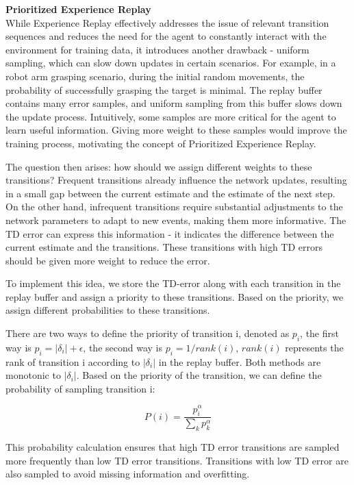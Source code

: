 \documentclass{article}
\begin{document}
\hspace*{\fill}

\noindent
\textbf{Prioritized Experience Replay}\\
\noindent
While Experience Replay effectively addresses the issue of relevant transition sequences and reduces the need for the agent to constantly interact with the environment for training data, it introduces another drawback - uniform sampling, which can slow down updates in certain scenarios. For example, in a robot arm grasping scenario, during the initial random movements, the probability of successfully grasping the target is minimal. The replay buffer contains many error samples, and uniform sampling from this buffer slows down the update process. Intuitively, some samples are more critical for the agent to learn useful information. Giving more weight to these samples would improve the training process, motivating the concept of Prioritized Experience Replay.

The question then arises: how should we assign different weights to these transitions? Frequent transitions already influence the network updates, resulting in a small gap between the current estimate and the estimate of the next step. On the other hand, infrequent transitions require substantial adjustments to the network parameters to adapt to new events, making them more informative. The TD error can express this information - it indicates the difference between the current estimate and the transitions. These transitions with high TD errors should be given more weight to reduce the error.

To implement this idea, we store the TD-error along with each transition in the replay buffer and assign a priority to these transitions. Based on the priority, we assign different probabilities to these transitions.

There are two ways to define the priority of transition i, denoted as $p_i$,  the first way is $p_i = \lvert \delta_i \rvert + \epsilon$, the second way is $p_i = 1 / rank(i)$, $rank(i)$ represents the rank of transition i according to $\lvert \delta_i \rvert$ in the replay buffer. Both methods are monotonic to $\lvert \delta_i \rvert$. Based on the priority of the transition, we can define the probability of sampling transition i:


\begin{equation}
P(i)=\frac{p_i^\alpha}{\sum_k p_k^\alpha}
\end{equation}

This probability calculation ensures that high TD error transitions are sampled more frequently than low TD error transitions. Transitions with low TD error are also sampled to avoid missing information and overfitting.
\end{document}
